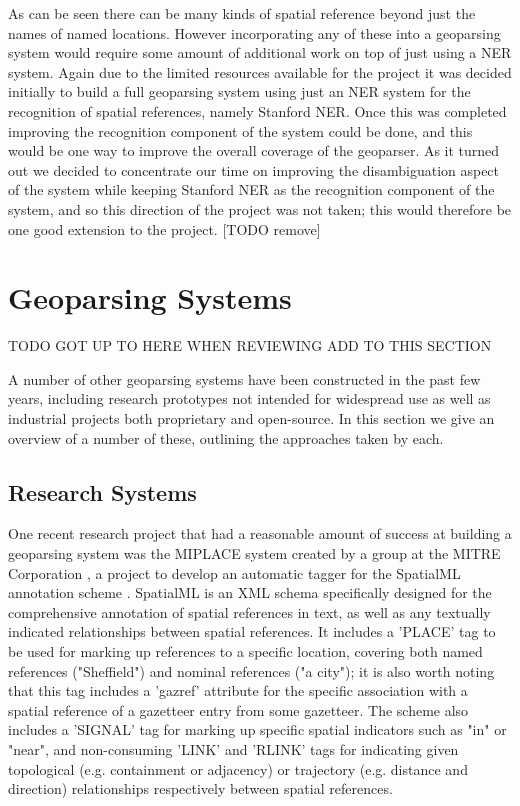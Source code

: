 \documentclass[12pt, a4paper]{report}
\begin{document}
As can be seen there can be many kinds of spatial reference beyond just the names of named locations. However incorporating any of these into a geoparsing system would require some amount of additional work on top of just using a NER system. Again due to the limited resources available for the project it was decided initially to build a full geoparsing system using just an NER system for the recognition of spatial references, namely Stanford NER. Once this was completed improving the recognition component of the system could be done, and this would be one way to improve the overall coverage of the geoparser. As it turned out we decided to concentrate our time on improving the disambiguation aspect of the system while keeping Stanford NER as the recognition component of the system, and so this direction of the project was not taken; this would therefore be one good extension to the project. [TODO remove]

\section{Geoparsing Systems}
\label{sec:geoparsing_systems}

TODO GOT UP TO HERE WHEN REVIEWING ADD TO THIS SECTION

A number of other geoparsing systems have been constructed in the past few years, including research prototypes not intended for widespread use as well as industrial projects both proprietary and open-source. In this section we give an overview of a number of these, outlining the approaches taken by each.

\subsection{Research Systems}
\label{subsec:research_systems}

One recent research project that had a reasonable amount of success at building a geoparsing system was the MIPLACE system created by a group at the MITRE Corporation \citep{mani2010}, a project to develop an automatic tagger for the SpatialML annotation scheme \citep{spatialml2009}. SpatialML is an XML schema specifically designed for the comprehensive annotation of spatial references in text, as well as any textually indicated relationships between spatial references. It includes a 'PLACE' tag to be used for marking up references to a specific location, covering both named references ("Sheffield") and nominal references ("a city"); it is also worth noting that this tag includes a 'gazref' attribute for the specific association with a spatial reference of a gazetteer entry from some gazetteer. The scheme also includes a 'SIGNAL' tag for marking up specific spatial indicators such as "in" or "near", and non-consuming 'LINK' and 'RLINK' tags for indicating given topological (e.g. containment or adjacency) or trajectory (e.g. distance and direction) relationships respectively between  spatial references.
\end{document}
